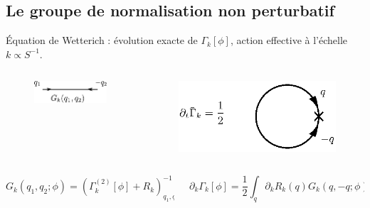 \documentclass[xcolor=dvipsnames]{beamer}
\newcommand{\p}[1]{\partial_{#1}}
\newcommand{\gam}{\ensuremath{\Gamma}} %
\begin{document}
\subsection{Le groupe de normalisation non perturbatif}
\begin{frame}

Équation de Wetterich : évolution exacte de $\gam_k[\phi]$, action effective à l'échelle $k \propto S^{-1}$.

\begin{columns}

\begin{column}{6cm}
\begin{figure}[htp]
\centering
\includegraphics[scale=0.825]{img/propagateur.pdf}
\label{}
\end{figure}
\end{column}

\begin{column}{6cm}
\begin{figure}[htp]
\centering
\includegraphics[scale=0.825]{img/dtgam.eps}
\label{}
\end{figure} 
\end{column}

\end{columns}

\begin{columns}

\begin{column}{6cm}
\[G_k(q_1,q_2 ; \phi) =  \left( \Gamma^{(2)}_k[\phi] + R_k \right)^{-1}_{q_1,q_2} \] 

\end{column}

\begin{column}{6cm}
\[\p{k} \gam_k[\phi] = \frac{1}{2} \int_q \p{k}R_k(q)  G_k(q,-q;\phi)  \] 
\end{column}

\end{columns}

\end{frame}
\end{document}
